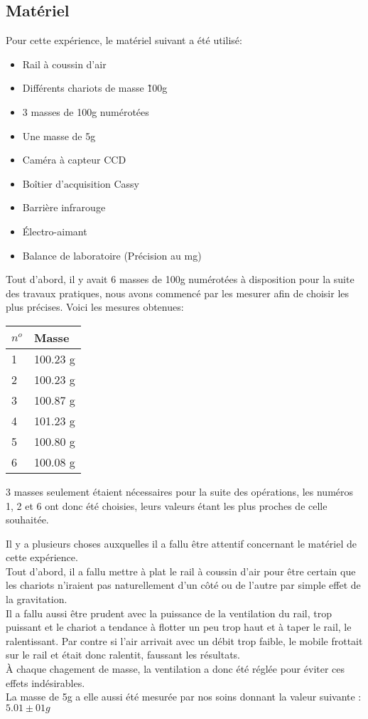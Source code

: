 \subsection{Matériel}
Pour cette expérience, le matériel suivant a été utilisé:
\begin{itemize}
    \item Rail à coussin d'air
    \item Différents chariots de masse \~100g
    \item 3 masses de 100g numérotées
    \item Une masse de 5g
    \item Caméra à capteur CCD
    \item Boîtier d'acquisition Cassy
    \item Barrière infrarouge
    \item Électro-aimant
    \item Balance de laboratoire (Précision au mg)
\end{itemize}


Tout d'abord, il y avait 6 masses de 100g numérotées à disposition pour la suite des travaux pratiques, nous avons commencé par les mesurer afin de choisir les plus précises. Voici les mesures obtenues:
\begin{table}[h]
    \centering
    \begin{tabular}{|l|l|}
	\hline
	$n^o$ & Masse \\
	\hline
	1 & 100.23 g \\
	2 & 100.23 g \\
	3 & 100.87 g \\
	4 & 101.23 g \\
	5 & 100.80 g \\
	6 & 100.08 g \\
	\hline
    \end{tabular}
\end{table}
3 masses seulement étaient nécessaires pour la suite des opérations, les numéros 1, 2 et 6 ont donc été choisies, leurs valeurs étant les plus proches de celle souhaitée.

Il y a plusieurs choses auxquelles il a fallu être attentif concernant le matériel de cette expérience.\\
Tout d'abord, il a fallu mettre à plat le rail à coussin d'air pour être certain que les chariots n'iraient pas naturellement d'un côté ou de l'autre par simple effet de la gravitation.\\
Il a fallu aussi être prudent avec la puissance de la ventilation du rail, trop puissant et le chariot a tendance à flotter un peu trop haut et à taper le rail, le ralentissant. Par contre si l'air arrivait avec un débit trop faible, le mobile frottait sur le rail et était donc ralentit, faussant les résultats.\\
À chaque chagement de masse, la ventilation a donc été réglée pour éviter ces effets indésirables.\\
La masse de 5g a elle aussi été mesurée par nos soins donnant la valeur suivante : $5.01 \pm 01g$

